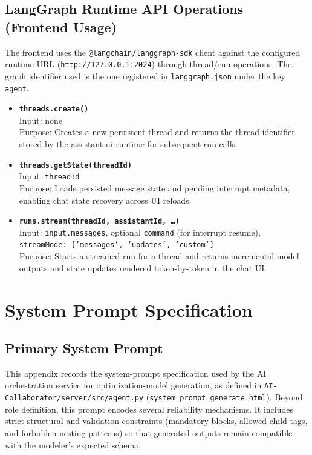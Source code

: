 \section{LangGraph Runtime API Operations (Frontend Usage)}
\label{sec:appendix-api-langgraph}

The frontend uses the \texttt{@langchain/langgraph-sdk} client against the configured runtime URL (\texttt{http://127.0.0.1:2024}) through thread/run operations. The graph identifier used is the one registered in \texttt{langgraph.json} under the key \texttt{agent}.

\begin{itemize}
    \item \textbf{\texttt{threads.create()}} \\
    Input: none \\
    Purpose: Creates a new persistent thread and returns the thread identifier stored by the assistant-ui runtime for subsequent run calls.

    \item \textbf{\texttt{threads.getState(threadId)}} \\
    Input: \texttt{threadId} \\
    Purpose: Loads persisted message state and pending interrupt metadata, enabling chat state recovery across UI reloads.

    \item \textbf{\texttt{runs.stream(threadId, assistantId, \ldots)}} \\
    Input: \texttt{input.messages}, optional \texttt{command} (for interrupt resume), \texttt{streamMode: ['messages', 'updates', 'custom']} \\
    Purpose: Starts a streamed run for a thread and returns incremental model outputs and state updates rendered token-by-token in the chat UI.
\end{itemize}

\chapter{System Prompt Specification}
\label{sec:appendix-system-prompt}

\section{Primary System Prompt}
This appendix records the system-prompt specification used by the AI orchestration service for optimization-model generation, as defined in \texttt{AI-Collaborator/server/src/agent.py} (\texttt{system\_prompt\_generate\_html}). Beyond role definition, this prompt encodes several reliability mechanisms. It includes strict structural and validation constraints (mandatory blocks, allowed child tags, and forbidden nesting patterns) so that generated outputs remain compatible with the modeler's expected schema.


